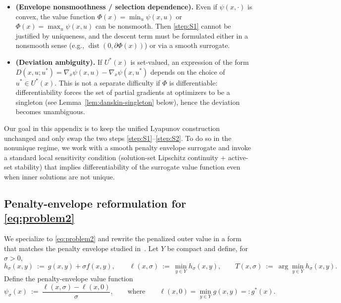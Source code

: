 \documentclass{article}
\newcommand{\1}{\mathbf{1}}
\begin{document}
\begin{itemize}
\item \textbf{(Envelope nonsmoothness / selection dependence).}
Even if $\psi(x,\cdot)$ is convex, the value function $\Phi(x)=\min_u \psi(x,u)$ or $\Phi(x)=\max_u\psi(x,u)$ can be nonsmooth.
Then \ref{step:S1} cannot be justified by uniqueness, and the descent term must be formulated either in a nonsmooth sense
(e.g., $\operatorname{dist}(0,\partial \Phi(x))$) or via a smooth surrogate.

\item \textbf{(Deviation ambiguity).}
If $U^*(x)$ is set-valued, an expression of the form
$D(x,u;u^*)=\nabla_x\psi(x,u)-\nabla_x\psi(x,u^*)$ depends on the choice of $u^*\in U^*(x)$.
This is not a separate difficulty if $\Phi$ is differentiable: differentiability forces the set of partial gradients at optimizers to be a singleton
(see Lemma~\ref{lem:danskin-singleton} below), hence the deviation becomes unambiguous.
\end{itemize}

Our goal in this appendix is to keep the unified Lyapunov construction unchanged and only swap the two steps
\ref{step:S1}--\ref{step:S2}. To do so in the nonunique regime, we work with a smooth penalty envelope surrogate
and invoke a standard local sensitivity condition (solution-set Lipschitz continuity + active-set stability) that implies
differentiability of the surrogate value function even when inner solutions are not unique.

\subsection{Penalty-envelope reformulation for \ref{eq:problem2}}\label{app:nonunique-setup}
We specialize to \ref{eq:problem2} and rewrite the penalized outer value in a form that matches the penalty envelope studied in~\cite{kwon2023penalty}.
Let $Y$ be compact and define, for $\sigma>0$,
\begin{equation}\label{eq:penalty-hsigma}
h_\sigma(x,y)\ :=\ g(x,y)+\sigma f(x,y),\qquad
\ell(x,\sigma)\ :=\ \min_{y\in Y} h_\sigma(x,y),\qquad
T(x,\sigma)\ :=\ \arg\min_{y\in Y} h_\sigma(x,y).
\end{equation}
Define the penalty-envelope value function
\begin{equation}\label{eq:psi-sigma-def}
\psi_\sigma(x)\ :=\ \frac{\ell(x,\sigma)-\ell(x,0)}{\sigma},
\qquad\text{where}\qquad \ell(x,0)=\min_{y\in Y}g(x,y)=:g^*(x).
\end{equation}
\end{document}
